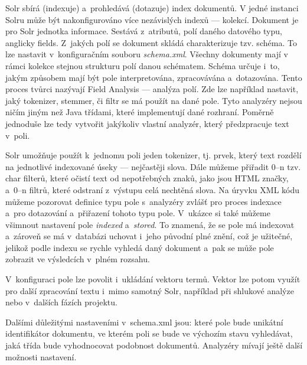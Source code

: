 Solr sbírá (indexuje) a~prohledává (dotazuje) index dokumentů. V jedné instanci Solru může být nakonfigurováno více nezávislých indexů --- kolekcí. Dokument je pro Solr jednotka informace. Sestává z~atributů, polí daného datového typu, anglicky fields.  Z~jakých polí se dokument skládá charakterizuje tzv. schéma. To lze nastavit v~konfiguračním souboru \emph{schema.xml}. Všechny dokumenty mají v rámci kolekce stejnou strukturu polí danou schématem. Schéma určuje i~to, jakým způsobem mají být pole interpretována, zpracovávána a~dotazována. Tento proces tvůrci nazývají Field Analysis --- analýza polí. Zde lze například nastavit, jaký tokenizer, stemmer, či filtr se má použít na dané pole. Tyto analyzéry nejsou ničím jiným než Java třídami, které implementují dané rozhraní. Poměrně jednoduše lze tedy vytvořit jakýkoliv vlastní analyzér, který předzpracuje text v~poli.

Solr umožňuje použít k~jednomu poli jeden tokenizer, tj. prvek, který text rozdělí na jednotlivé indexované úseky --- nejčastěji slova. Dále můžeme přiřadit 0--n tzv. char filterů, které očistí text od nepotřebných znaků, jako jsou HTML značky, a~0--n filtrů, které odstraní z~výstupu celá nechtěná slova. Na úryvku XML kódu můžeme pozorovat definice typu pole s~analyzéry zvlášť pro proces indexace a~pro dotazování a~přiřazení tohoto typu pole. V~ukázce si také můžeme všimnout nastavení pole \emph{indexed} a~\emph{stored}. To znamená, že se pole má indexovat a~zároveň se má v~databázi uchovat i~jeho původní plné znění, což je užitečné, jelikož podle indexu se rychle vyhledá daný dokument a~pak se může pole zobrazit ve výsledcích v~plném rozsahu.

V~konfiguraci pole lze povolit i~ukládání vektoru termů. Vektor lze potom využít pro další zpracování textu i~mimo samotný Solr, například při shlukové analýze nebo v~dalších fázích projektu.

Dalšími důležitými nastaveními v~schema.xml jsou: které pole bude unikátní identifikátor dokumentu, ve kterém poli se bude ve výchozím stavu vyhledávat, jaká třída bude vyhodnocovat podobnost dokumentů. Analyzéry mívají ještě další možnosti nastavení.

